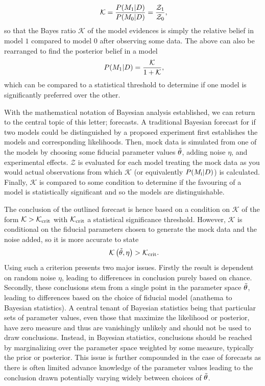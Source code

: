 \documentclass[twocolumn,english,aps,prl,amsmath,amssymb,reprint,footinbib,floatfix,showkeys]{revtex4-2}
\newcommand{\modelz}{M_{\rm 0}}
\newcommand{\modelo}{M_{\rm 1}}
\newcommand{\Z}{\mathcal{Z}}
\newcommand{\br}{\mathcal{K}}
\begin{document}
\begin{equation}~\label{eqn:bayes_ratio}
    \br = \frac{P(\modelo| D)}{P(\modelz | D)} = \frac{\Z_{\rm 1} }{\Z_{\rm 0}},
\end{equation}
so that the Bayes ratio $\br$ of the model evidences is simply the relative belief in model $1$ compared to model $0$ after observing some data. 
The above can also be rearranged to find the posterior belief in a model 
\begin{equation}~\label{eqn:model_posterior_absolute}
    P(\modelo| D) = \frac{\br}{1 + \br},
\end{equation}
which can be compared to a statistical threshold to determine if one model is significantly preferred over the other. 




With the mathematical notation of Bayesian analysis established, we can return to the central topic of this letter; forecasts.
A traditional Bayesian forecast for if two models could be distinguished by a proposed experiment first establishes the models and corresponding likelihoods.
Then, mock data is simulated from one of the models by choosing some fiducial parameter values $\Tilde{\theta}$, adding noise $\eta$, and experimental effects.
$\Z$ is evaluated for each model treating the mock data as you would actual observations from which $\br$ (or equivalently $P(M_{\rm i}| D)$) is calculated. 
Finally, $\br$ is compared to some condition to determine if the favouring of a model is statistically significant and so the models are distinguishable.


The conclusion of the outlined forecast is hence based on a condition on $\br$ of the form $\br > \br_{\rm crit}$ with $\br_{\rm crit}$ a statistical significance threshold. 
However, $\br$ is conditional on the fiducial parameters chosen to generate the mock data and the noise added, so it is more accurate to state
\begin{equation}~\label{eqn:partially_bayesian_forecast}
    \br\left(\Tilde{\theta}, \eta\right) > \br_{\rm crit}.
\end{equation}
Using such a criterion presents two major issues. 
Firstly the result is dependent on random noise $\eta$, leading to differences in conclusion purely based on chance.
Secondly, these conclusions stem from a single point in the parameter space $\Tilde{\theta}$, leading to differences based on the choice of fiducial model (anathema to Bayesian statistics).
A central tenant of Bayesian statistics being that particular sets of parameter values, even those that maximize the likelihood or posterior, have zero measure and thus are vanishingly unlikely and should not be used to draw conclusions.
Instead, in Bayesian statistics, conclusions should be reached by marginalizing over the parameter space weighted by some measure, typically the prior or posterior. 
This issue is further compounded in the case of forecasts as there is often limited advance knowledge of the parameter values leading to the conclusion drawn potentially varying widely between choices of $\Tilde{\theta}$.
\end{document}
